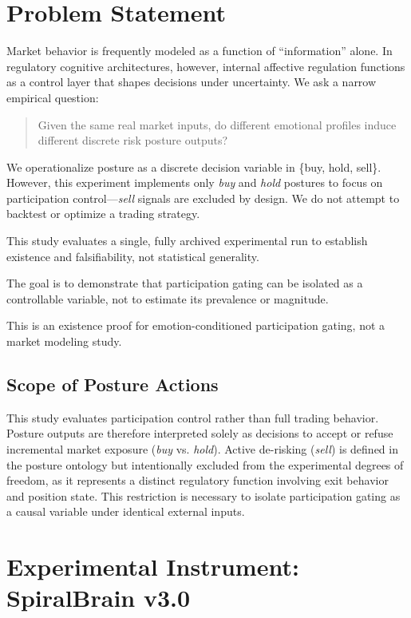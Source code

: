 \documentclass[12pt,a4paper]{article}
\begin{document}
\section{Problem Statement}

Market behavior is frequently modeled as a function of ``information'' alone. In regulatory cognitive architectures, however, internal affective regulation functions as a control layer that shapes decisions under uncertainty. We ask a narrow empirical question:

\begin{quote}
Given the same real market inputs, do different emotional profiles induce different discrete risk posture outputs?
\end{quote}

We operationalize posture as a discrete decision variable in \{buy, hold, sell\}. However, this experiment implements only \emph{buy} and \emph{hold} postures to focus on participation control—\emph{sell} signals are excluded by design. We do not attempt to backtest or optimize a trading strategy.

This study evaluates a single, fully archived experimental run to establish existence and falsifiability, not statistical generality.

The goal is to demonstrate that participation gating can be isolated as a controllable variable, not to estimate its prevalence or magnitude.

This is an existence proof for emotion-conditioned participation gating, not a market modeling study.

\subsection{Scope of Posture Actions}

This study evaluates participation control rather than full trading behavior. Posture outputs are therefore interpreted solely as decisions to accept or refuse incremental market exposure (\emph{buy} vs. \emph{hold}). Active de-risking (\emph{sell}) is defined in the posture ontology but intentionally excluded from the experimental degrees of freedom, as it represents a distinct regulatory function involving exit behavior and position state. This restriction is necessary to isolate participation gating as a causal variable under identical external inputs.

\section{Experimental Instrument: SpiralBrain v3.0}
\end{document}
